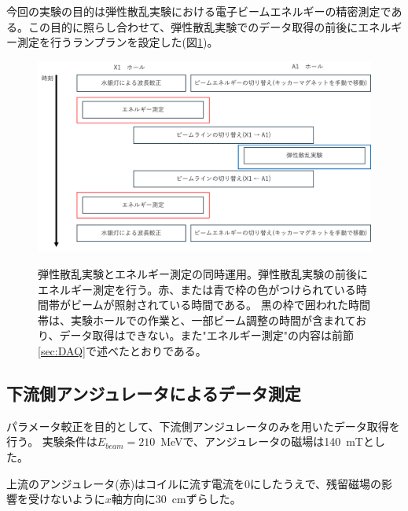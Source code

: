 \documentclass[a4paper,11pt,uplatex]{jsbook}
\begin{document}
今回の実験の目的は弾性散乱実験における電子ビームエネルギーの精密測定である。この目的に照らし合わせて、弾性散乱実験でのデータ取得の前後にエネルギー測定を行うランプランを設定した(図\ref{beamtime})。
\begin{figure}
  \centering
  \includegraphics[width=\linewidth]{image/3-beamtime.png}\\
  \caption[弾性散乱実験とエネルギー測定の同時運用]{弾性散乱実験とエネルギー測定の同時運用。弾性散乱実験の前後にエネルギー測定を行う。赤、または青で枠の色がつけられている時間帯がビームが照射されている時間である。
  黒の枠で囲われた時間帯は、実験ホールでの作業と、一部ビーム調整の時間が含まれており、データ取得はできない。また"エネルギー測定"の内容は前節\ref{sec:DAQ}で述べたとおりである。}
  \label{beamtime}
\end{figure}
\subsection{下流側アンジュレータによるデータ測定}
パラメータ較正を目的として、下流側アンジュレータのみを用いたデータ取得を行う。
実験条件は$E_{beam} = 210$~MeVで、アンジュレータの磁場は140~mTとした。

上流のアンジュレータ(赤)はコイルに流す電流を0にしたうえで、残留磁場の影響を受けないように$x$軸方向に30~cmずらした。
\end{document}
